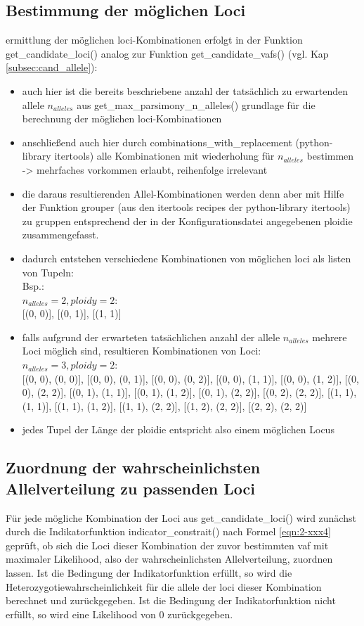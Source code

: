 \subsection{Bestimmung der möglichen Loci} \label{subsec:comb_loci}
ermittlung der möglichen loci-Kombinationen erfolgt in der Funktion get\_candidate\_loci() analog zur Funktion get\_candidate\_vafs() (vgl. Kap \ref{subsec:cand_allele}):
\begin{itemize}
	\item auch hier ist die bereits beschriebene anzahl der tatsächlich zu erwartenden allele $n_{alleles}$ aus get\_max\_parsimony\_n\_alleles() grundlage für die berechnung der möglichen loci-Kombinationen 
	\item anschließend auch hier durch combinations\_with\_replacement (python-library itertools) alle Kombinationen mit wiederholung für $n_{alleles} $ bestimmen -> mehrfaches vorkommen erlaubt, reihenfolge irrelevant 
	\item die daraus resultierenden Allel-Kombinationen werden denn aber mit Hilfe der Funktion grouper (aus den itertools recipes der python-library itertools) zu gruppen entsprechend der in der Konfigurationsdatei angegebenen ploidie zusammengefasst.
	\item dadurch entstehen verschiedene Kombinationen von möglichen loci als listen von Tupeln:\\
		Bsp.: \\
	    $ n_{alleles} = 2, ploidy = 2$: \\
	    {[(0, 0)]}, {[(0, 1)]}, {[(1, 1)]} \\
	\item falls aufgrund der erwarteten tatsächlichen anzahl der allele $n_{alleles} $ mehrere Loci möglich sind, resultieren Kombinationen von Loci:\\
	    $ n_{alleles} = 3, ploidy = 2$: \\
	    {[(0, 0), (0, 0)]}, {[(0, 0), (0, 1)]}, {[(0, 0), (0, 2)]}, {[(0, 0), (1, 1)]}, {[(0, 0), (1, 2)]}, {[(0, 0), (2, 2)]}, {[(0, 1), (1, 1)]}, {[(0, 1), (1, 2)]}, {[(0, 1), (2, 2)]}, {[(0, 2), (2, 2)]}, {[(1, 1), (1, 1)]}, {[(1, 1), (1, 2)]}, {[(1, 1), (2, 2)]}, {[(1, 2), (2, 2)]}, {[(2, 2), (2, 2)]} \\
	\item jedes Tupel der Länge der ploidie entspricht also einem möglichen Locus
\end{itemize}

\subsection{Zuordnung der wahrscheinlichsten Allelverteilung zu passenden Loci} \label{subsec:lh_loci}
Für jede mögliche Kombination der Loci  aus get\_candidate\_loci() wird zunächst durch die Indikatorfunktion indicator\_constrait() nach Formel \eqref{eqn:2-xxx4} geprüft, ob sich die Loci dieser Kombination der zuvor bestimmten vaf mit maximaler Likelihood, also der wahrscheinlichsten Allelverteilung, zuordnen lassen. Ist die Bedingung der Indikatorfunktion erfüllt, so wird die Heterozygotiewahrscheinlichkeit für die allele der loci dieser Kombination berechnet und zurückgegeben. Ist die Bedingung der Indikatorfunktion nicht erfüllt, so wird eine Likelihood von 0 zurückgegeben.

